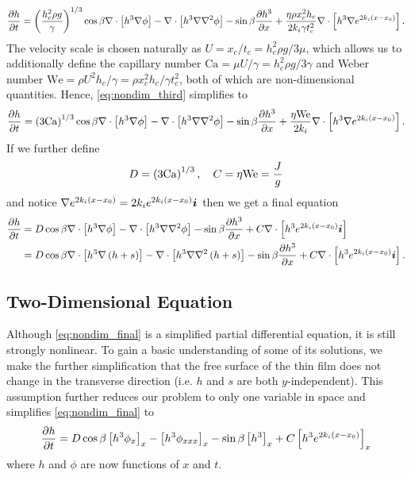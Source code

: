 \begin{align}
    \frac{\partial h}{\partial t} = \left( \frac{h_c^2 \rho g}{\gamma} \right)^{1/3} \cos\beta \nabla \cdot \left[  h^3 \nabla \phi  \right] - 
    \nabla \cdot \left[ h^3 \nabla\nabla^2\phi  \right] - 
    \sin\beta \frac{\partial h^3}{\partial x} + 
    \frac{\eta \rho x_c^2 h_c}{2k_i \gamma t_c^2} \nabla \cdot \left[ h^3 \nabla e^{2k_i \left( x-x_0 \right)} \right].
    \label{eq:nondim_third}
\end{align}  
The velocity scale is chosen naturally as $U = x_c/t_c = h_c^2\rho g/3\mu$,
which allows us to additionally define the capillary number $\mathrm{Ca} = \mu U / \gamma = h_c^2\rho g/3\gamma$
and Weber number $\mathrm{We} = \rho U^2 h_c / \gamma = \rho x_c^2 h_c / \gamma t_c^2$, both of which
are non-dimensional quantities. Hence, 
\cref{eq:nondim_third} simplifies to 
\begin{align}
    \frac{\partial h}{\partial t} = \left( 3\mathrm{Ca} \right)^{1/3} \cos\beta \nabla \cdot \left[  h^3 \nabla \phi  \right] - 
    \nabla \cdot \left[ h^3 \nabla\nabla^2\phi  \right] - 
    \sin\beta \frac{\partial h^3}{\partial x} + 
    \frac{\eta \mathrm{We}}{2k_i} \nabla \cdot \left[ h^3 \nabla e^{2k_i \left( x-x_0 \right)} \right].
    \label{eq:nondim_fourth}
\end{align}  
If we further define 
\begin{equation*}
    D = \left( 3\mathrm{Ca} \right)^{1/3}, \quad C = \eta \mathrm{We} = \frac{J}{g}
\end{equation*}
and notice $\nabla e^{2k_i \left( x-x_0 \right)} = 2k_i e^{2k_i \left( x-x_0 \right)}\boldsymbol{i}$ then we get a final equation 
\begin{align}
    \begin{aligned}
    \frac{\partial h}{\partial t} &= D \cos\beta \nabla \cdot \left[  h^3 \nabla \phi  \right] - 
    \nabla \cdot \left[ h^3 \nabla\nabla^2\phi  \right] - 
    \sin\beta \frac{\partial h^3}{\partial x} + 
    C \nabla \cdot \left[ h^3 e^{2k_i \left( x-x_0 \right)}\boldsymbol{i} \right]\\
    &= D \cos\beta \nabla \cdot \left[  h^3 \nabla \left( h+s \right)  \right] - 
    \nabla \cdot \left[ h^3 \nabla\nabla^2\left( h+s \right)  \right] - 
    \sin\beta \frac{\partial h^3}{\partial x} + 
    C \nabla \cdot \left[ h^3 e^{2k_i \left( x-x_0 \right)}\boldsymbol{i} \right].
    \end{aligned}
    \label{eq:nondim_final}
\end{align}  

\subsection{Two-Dimensional Equation}
Although \cref{eq:nondim_final} is a simplified partial differential equation, 
it is still strongly nonlinear. To gain a basic understanding of some of its solutions,
we make the further simplification that the free surface of the thin film does not change
in the transverse direction (i.e.\! $h$ and $s$ are both $y$-independent). This assumption
further reduces our problem to only one variable in space and simplifies \cref{eq:nondim_final} to 
\begin{align}
    \frac{\partial h}{\partial t} = D\cos\beta \left[ h^3 \phi_x \right]_x - \left[ h^3 \phi_{xxx} \right]_{x} - \sin\beta \left[ h^3 \right]_{x} + C \left[ h^3 e^{2k_i \left( x-x_0 \right)} \right]_x
    \label{eq:two_dim_final}
\end{align}
where $h$ and $\phi$ are now functions of $x$ and $t$.    